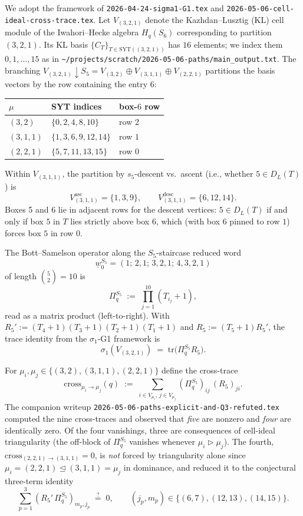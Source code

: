 \documentclass[11pt]{article}
\theoremstyle{definition}
\begin{document}
We adopt the framework of \texttt{2026-04-24-sigma1-G1.tex} and \texttt{2026-05-06-cell-ideal-cross-trace.tex}. Let $V_{(3,2,1)}$ denote the Kazhdan--Lusztig (KL) cell module of the Iwahori--Hecke algebra $H_q(S_6)$ corresponding to partition $(3,2,1)$. Its KL basis $\{C_T\}_{T \in \mathrm{SYT}((3,2,1))}$ has $16$ elements; we index them $0, 1, \ldots, 15$ as in \texttt{\textasciitilde/projects/scratch/2026-05-06-paths/main\_output.txt}. The branching $V_{(3,2,1)} \downarrow S_5 = V_{(3,2)} \oplus V_{(3,1,1)} \oplus V_{(2,2,1)}$ partitions the basis vectors by the row containing the entry $6$:
\begin{center}
\begin{tabular}{l|l|l}
$\mu$ & SYT indices & box-$6$ row\\\hline
$(3,2)$    & $\{0,2,4,8,10\}$ & row $2$\\
$(3,1,1)$  & $\{1,3,6,9,12,14\}$ & row $1$\\
$(2,2,1)$  & $\{5,7,11,13,15\}$ & row $0$
\end{tabular}
\end{center}
Within $V_{(3,1,1)}$, the partition by $s_5$-descent vs.\ ascent (i.e., whether $5 \in D_L(T)$) is
\[
V_{(3,1,1)}^{\text{asc}} = \{1, 3, 9\}, \qquad V_{(3,1,1)}^{\text{desc}} = \{6, 12, 14\}.
\]
Boxes 5 and 6 lie in adjacent rows for the descent vertices: $5 \in D_L(T)$ if and only if box $5$ in $T$ lies strictly above box $6$, which (with box $6$ pinned to row $1$) forces box $5$ in row $0$.

The Bott--Samelson operator along the $S_5$-staircase reduced word
\[
\underline{w}_0^{S_5} = (1;\, 2,1;\, 3,2,1;\, 4,3,2,1)
\]
of length $\binom{5}{2} = 10$ is
\[
\Pi_q^{S_5} \;:=\; \prod_{j=1}^{10}(T_{i_j}+1),
\]
read as a matrix product (left-to-right). With $R_5' := (T_4+1)(T_3+1)(T_2+1)(T_1+1)$ and $R_5 := (T_5+1)R_5'$, the trace identity from the $\sigma_1$-G1 framework is
\[
\sigma_1(V_{(3,2,1)}) \;=\; \mathrm{tr}\bigl(\Pi_q^{S_5} R_5 \bigr).
\]

For $\mu_i, \mu_j \in \{(3,2), (3,1,1), (2,2,1)\}$ define the cross-trace
\[
\mathrm{cross}_{\mu_i \to \mu_j}(q) \;:=\; \sum_{i \in V_{\mu_i},\, j \in V_{\mu_j}} (\Pi_q^{S_5})_{ij}\,(R_5)_{ji}.
\]
The companion writeup \texttt{2026-05-06-paths-explicit-and-Q3-refuted.tex} computed the nine cross-traces and observed that \emph{five} are nonzero and \emph{four} are identically zero. Of the four vanishings, three are consequences of cell-ideal triangularity \cite[Theorem~2.1]{cell-ideal} (the off-block of $\Pi_q^{S_5}$ vanishes whenever $\mu_i \triangleright \mu_j$). The fourth, $\mathrm{cross}_{(2,2,1)\to(3,1,1)} = 0$, is \emph{not} forced by triangularity alone since $\mu_i = (2,2,1) \trianglelefteq (3,1,1) = \mu_j$ in dominance, and \cite[Lemma~4.2]{cell-ideal} reduced it to the conjectural three-term identity
\begin{equation}\label{eq:conj-43}
\sum_{p=1}^3 (R_5' \, \Pi_q^{S_5})_{m_p, j_p} \;\stackrel{?}{=}\; 0, \qquad (j_p, m_p) \in \{(6,7), (12,13), (14,15)\}.
\end{equation}
\end{document}
